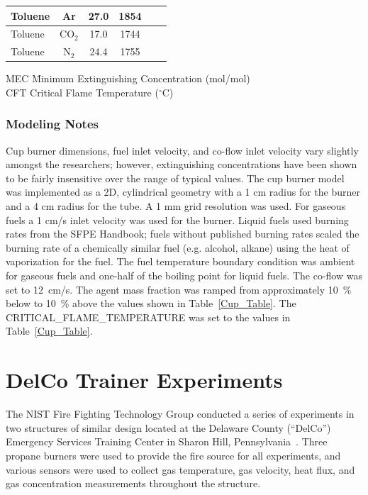\begin{table}[p]
\begin{tabular}{|l|c|c|c|c|l|}
Toluene    & Ar      & 27.0 & 1854 & \cite{Moore:1}  \\ \hline
Toluene    & CO$_2$  & 17.0 & 1744 & \cite{Yamamoto:1,Sakei:1}  \\ \hline
Toluene    & N$_2$   & 24.4 & 1755 & \cite{Yamamoto:1,Sakei:1}  \\ \hline
\end{tabular}
\noindent
\begin{tabbing}
MEC  \hspace{0.05in} \= Minimum Extinguishing Concentration (mol/mol) \\
CFT                  \> Critical Flame Temperature ($^\circ$C)
\end{tabbing}
\end{table}


\subsubsection{Modeling Notes}

Cup burner dimensions, fuel inlet velocity, and co-flow inlet velocity vary slightly amongst the researchers; however, extinguishing concentrations have been shown to be fairly insensitive over the range of typical values. The cup burner model was implemented as a 2D, cylindrical geometry with a 1 cm radius for the burner and a 4 cm radius for the tube. A 1 mm grid resolution was used. For gaseous fuels a 1 cm/s inlet velocity was used for the burner. Liquid fuels used burning rates from the SFPE Handbook; fuels without published burning rates scaled the burning rate of a chemically similar fuel (e.g. alcohol, alkane) using the heat of vaporization for the fuel. The fuel temperature boundary condition was ambient for gaseous fuels and one-half of the boiling point for liquid fuels. The co-flow was set to 12~cm/s. The agent mass fraction was ramped from approximately 10~\% below to 10~\% above the values shown in Table~\ref{Cup_Table}. The {\ct CRITICAL\_FLAME\_TEMPERATURE} was set to the values in Table~\ref{Cup_Table}.

\section{DelCo Trainer Experiments}
\label{DelCo_Description}

The NIST Fire Fighting Technology Group conducted a series of experiments in two structures of similar design located at the Delaware County (``DelCo'') Emergency Services Training Center in Sharon Hill, Pennsylvania~\cite{DelCo_TN}. Three propane burners were used to provide the fire source for all experiments, and various sensors were used to collect gas temperature, gas velocity, heat flux, and gas concentration measurements throughout the structure.

